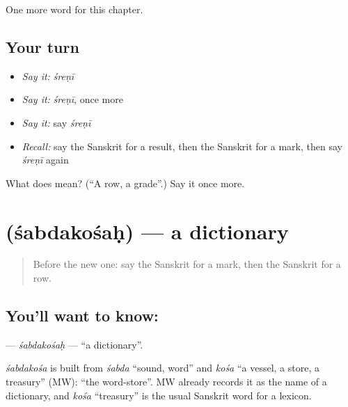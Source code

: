 \begin{grammarlens}[title={What you've built}]
One more word for this chapter.
\end{grammarlens}

\subsection*{Your turn}
\begin{itemize}
\raggedright
  \item \emph{Say it:} \emph{śreṇī}
  \item \emph{Say it:} \emph{śreṇī}, once more
  \item \emph{Say it:} say \emph{śreṇī}
  \item \emph{Recall:} say the Sanskrit for a result, then the Sanskrit for a mark, then say \emph{śreṇī} again
\end{itemize}

\begin{tcolorbox}[breakable,colback=teal!4,colframe=teal!35!black,title={Before you move on}]
What does  mean? (\textquotedblleft{}A row, a grade\textquotedblright{}.) Say it once more.
\end{tcolorbox}
\section[\texorpdfstring{\sk{शब्दकोशः} (śabdakośaḥ)}{शब्दकोशः (śabdakośaḥ)}]{ (śabdakośaḥ) — a dictionary}

\label{lesson:SA-C169-sabdakosah}



\begin{quote}
Before the new one: say the Sanskrit for a mark, then the Sanskrit for a row.
\end{quote}

\subsection*{You'll want to know: }
\textbf{} — \emph{śabdakośaḥ} — \textquotedblleft{}a dictionary\textquotedblright{}.

\begin{cousinweb}
\emph{śabdakośa} is built from \emph{śabda} \textquotedblleft{}sound, word\textquotedblright{} and \emph{kośa} \textquotedblleft{}a vessel, a store, a treasury\textquotedblright{} (MW): \textquotedblleft{}the word-store\textquotedblright{}. MW already records it as the name of a dictionary, and \emph{kośa} \textquotedblleft{}treasury\textquotedblright{} is the usual Sanskrit word for a lexicon.
\end{cousinweb}

